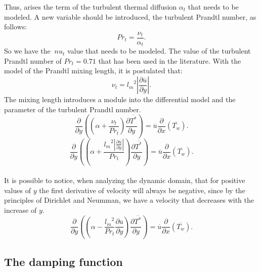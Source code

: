 \documentclass[10pt]{article} %
\begin{document}
Thus, arises the term of the turbulent thermal diffusion $\alpha_t$ that needs to be modeled. A new variable should be introduced, the turbulent Prandtl number, as follows:
\begin{equation}
Pr_t = \frac{\nu_t}{\alpha_t}.
\end{equation} 
So we have the $ \ nu_t $ value that needs to be modeled. The value of the turbulent Prandtl number of $ Pr_t = 0.71 $ that has been used in the literature.
With the model of the Prandtl mixing length, it is postulated that:
\begin{equation}
\nu_t = {l_m}^2 \left| \frac{\partial \overline{u}}{\partial y} \right|.
\end{equation}
The mixing length introduces a module into the differential model and the parameter of the turbulent Prandtl number.
\\
\begin{equation}
{\frac{\partial{}}{\partial{y}}} \left( \left( \alpha   
+ \frac{\nu_t}{Pr_t} \right) \frac{\partial \overline{T^\ast}}{\partial y} \right)
= 
\overline{u}\frac{\partial{}}{\partial{x}}\left(\overline{T_w}\right)  .
\end{equation}
\begin{equation}
{\frac{\partial{}}{\partial{y}}} \left( \left( \alpha   
+ \frac{{l_m}^2 \left| \frac{\partial \overline{u}}{\partial y} \right|}{Pr_t} \right) \frac{\partial \overline{T^\ast}}{\partial y} \right)
= 
\overline{u}\frac{\partial{}}{\partial{x}}\left(\overline{T_w}\right)  .
\end{equation}
\\

It is possible to notice, when analyzing the dynamic domain, that for positive values of $ y $ the first derivative of velocity will always be negative, since by the principles of Dirichlet and Neumman, we have a velocity that decreases with the increase of $ y $.\\
\begin{equation}
{\frac{\partial{}}{\partial{y}}} \left( \left( \alpha   
- \frac{{l_m}^2}{Pr_t}\frac{\partial \overline{u}}{\partial y} \right) \frac{\partial \overline{T^\ast}}{\partial y} \right)
= 
\overline{u}\frac{\partial{}}{\partial{x}}\left(\overline{T_w}\right)  .
\end{equation}



\subsection{The damping function}
\end{document}
